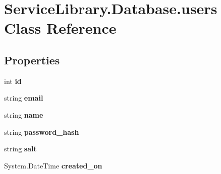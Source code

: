 \hypertarget{class_service_library_1_1_database_1_1users}{\section{Service\-Library.\-Database.\-users Class Reference}
\label{class_service_library_1_1_database_1_1users}
}
\subsection*{Properties}
\begin{DoxyCompactItemize}
\item 
\hypertarget{class_service_library_1_1_database_1_1users_a10c9c0bc565ccb97257775501160e535}{int {\bfseries id}}\label{class_service_library_1_1_database_1_1users_a10c9c0bc565ccb97257775501160e535}

\item 
\hypertarget{class_service_library_1_1_database_1_1users_a00e3e41e170b4fe7b655a6069ae163a1}{string {\bfseries email}}\label{class_service_library_1_1_database_1_1users_a00e3e41e170b4fe7b655a6069ae163a1}

\item 
\hypertarget{class_service_library_1_1_database_1_1users_a8f9efd15895a9e0e9f981697259786f3}{string {\bfseries name}}\label{class_service_library_1_1_database_1_1users_a8f9efd15895a9e0e9f981697259786f3}

\item 
\hypertarget{class_service_library_1_1_database_1_1users_aa63a319d0addf66430a084632853f07a}{string {\bfseries password\-\_\-hash}}\label{class_service_library_1_1_database_1_1users_aa63a319d0addf66430a084632853f07a}

\item 
\hypertarget{class_service_library_1_1_database_1_1users_ac37d4eefac4cf9977c0d7691e6b67640}{string {\bfseries salt}}\label{class_service_library_1_1_database_1_1users_ac37d4eefac4cf9977c0d7691e6b67640}

\item 
\hypertarget{class_service_library_1_1_database_1_1users_a815b727479c302618e38348e1ae7afa9}{System.\-Date\-Time {\bfseries created\-\_\-on}}\label{class_service_library_1_1_database_1_1users_a815b727479c302618e38348e1ae7afa9}


\end{DoxyCompactItemize}
